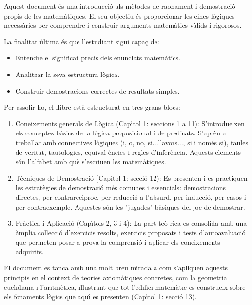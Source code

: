 \documentclass[12pt,a4paper,oneside]{book}
\theoremstyle{plain}
\theoremstyle{definition}
\theoremstyle{remark}
\numberwithin{equation}{section}
\begin{document}
Aquest document \'{e}s una introducci\'{o} als m\`{e}todes de raonament i
demostraci\'{o} propis de les matem\`{a}tiques. El seu objectiu \'{e}s
proporcionar les eines l\`{o}giques necess\`{a}ries per comprendre i
construir arguments matem\`{a}tics v\`{a}lids i rigorosos.

La finalitat \'{u}ltima \'{e}s que l'estudiant sigui capa\c{c} de:

\begin{itemize}
\item Entendre el significat prec\'{\i}s dels enunciats matem\`{a}tics.

\item Analitzar la seva estructura l\`{o}gica.

\item Construir demostracions correctes de resultats simples.
\end{itemize}

Per assolir-ho, el llibre est\`{a} estructurat en tres grans blocs:

\begin{enumerate}
\item Coneixements generals de L\`{o}gica (Cap\'{\i}tol 1: seccions 1 a 11):
S'introdueixen els conceptes b\`{a}sics de la l\`{o}gica proposicional i de
predicats. S'aprèn a treballar amb connectives l\`{o}giques (i, o, no,
si...llavors..., si i nom\'{e}s si), taules de veritat, tautologies, equival%
\`{e}ncies i regles d'infer\`{e}ncia. Aquests elements s\'{o}n l'alfabet amb
qu\`{e} s'escriuen les matem\`{a}tiques.

\item T\`{e}cniques de Demostraci\'{o} (Cap\'{\i}tol 1: secci\'{o} 12): Es
presenten i es practiquen les estrat\`{e}gies de demostraci\'{o} m\'{e}s
comunes i essencials: demostracions directes, per contrarec\'{\i}proc, per
reducci\'{o} a l'absurd, per inducci\'{o}, per casos i per contraexemple.
Aquestes s\'{o}n les "jugades" b\`{a}siques del joc de demostrar.

\item Pr\`{a}ctica i Aplicaci\'{o} (Cap\'{\i}tols 2, 3 i 4): La part te\`{o}%
rica es consolida amb una \`{a}mplia col\textperiodcentered lecci\'{o}
d'exercicis resolts, exercicis proposats i tests d'autoavaluaci\'{o} que
permeten posar a prova la comprensi\'{o} i aplicar els coneixements
adquirits.
\end{enumerate}

El document es tanca amb una molt breu mirada a com s'apliquen aquests
principis en el context de teories axiom\`{a}tiques concretes, com la
geometria euclidiana i l'aritm\`{e}tica, il\textperiodcentered lustrant que
tot l'edifici matem\`{a}tic es construeix sobre els fonaments l\`{o}gics que
aqu\'{\i} es presenten (Cap\'{\i}tol 1: secci\'{o} 13).
\end{document}
